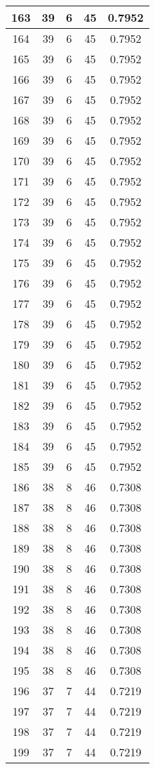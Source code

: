 \documentclass[letterpaper, 12pt]{article}
\begin{document}
\begin{longtable}{|c|c|c|c|c|}
\hline
163 & 39 & 6 & 45 & 0.7952 \\
\hline
164 & 39 & 6 & 45 & 0.7952 \\
\hline
165 & 39 & 6 & 45 & 0.7952 \\
\hline
166 & 39 & 6 & 45 & 0.7952 \\
\hline
167 & 39 & 6 & 45 & 0.7952 \\
\hline
168 & 39 & 6 & 45 & 0.7952 \\
\hline
169 & 39 & 6 & 45 & 0.7952 \\
\hline
170 & 39 & 6 & 45 & 0.7952 \\
\hline
171 & 39 & 6 & 45 & 0.7952 \\
\hline
172 & 39 & 6 & 45 & 0.7952 \\
\hline
173 & 39 & 6 & 45 & 0.7952 \\
\hline
174 & 39 & 6 & 45 & 0.7952 \\
\hline
175 & 39 & 6 & 45 & 0.7952 \\
\hline
176 & 39 & 6 & 45 & 0.7952 \\
\hline
177 & 39 & 6 & 45 & 0.7952 \\
\hline
178 & 39 & 6 & 45 & 0.7952 \\
\hline
179 & 39 & 6 & 45 & 0.7952 \\
\hline
180 & 39 & 6 & 45 & 0.7952 \\
\hline
181 & 39 & 6 & 45 & 0.7952 \\
\hline
182 & 39 & 6 & 45 & 0.7952 \\
\hline
183 & 39 & 6 & 45 & 0.7952 \\
\hline
184 & 39 & 6 & 45 & 0.7952 \\
\hline
185 & 39 & 6 & 45 & 0.7952 \\
\hline
186 & 38 & 8 & 46 & 0.7308 \\
\hline
187 & 38 & 8 & 46 & 0.7308 \\
\hline
188 & 38 & 8 & 46 & 0.7308 \\
\hline
189 & 38 & 8 & 46 & 0.7308 \\
\hline
190 & 38 & 8 & 46 & 0.7308 \\
\hline
191 & 38 & 8 & 46 & 0.7308 \\
\hline
192 & 38 & 8 & 46 & 0.7308 \\
\hline
193 & 38 & 8 & 46 & 0.7308 \\
\hline
194 & 38 & 8 & 46 & 0.7308 \\
\hline
195 & 38 & 8 & 46 & 0.7308 \\
\hline
196 & 37 & 7 & 44 & 0.7219 \\
\hline
197 & 37 & 7 & 44 & 0.7219 \\
\hline
198 & 37 & 7 & 44 & 0.7219 \\
\hline
199 & 37 & 7 & 44 & 0.7219 \\
\hline
\end{longtable}
\end{document}
